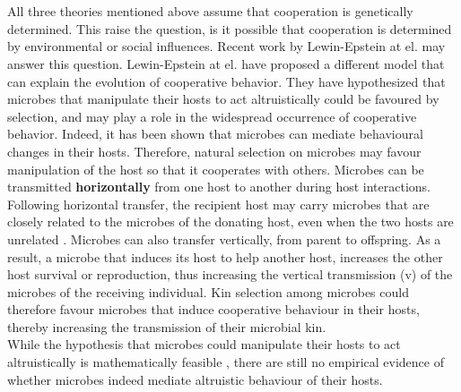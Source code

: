 \documentclass{article}
\begin{document}
\\\\All three theories mentioned above assume that cooperation is genetically determined. This raise the question, is it possible that cooperation is determined by environmental or social influences. Recent work by Lewin-Epstein at el.\cite{lewin2017microbes} may answer this question. 
Lewin-Epstein at el. \cite{lewin2017microbes} have proposed a different model that can explain the evolution of  cooperative behavior. They have hypothesized that microbes that manipulate their hosts to act altruistically could be favoured by selection, and may play a role in the widespread occurrence of cooperative behavior. Indeed, it has been shown that microbes can mediate behavioural changes in their hosts\cite{poulin2010parasite}\cite{dobson1988population}. Therefore, natural selection on microbes may favour manipulation of the host so that it cooperates with others. Microbes can be transmitted \textbf{horizontally} from one host to another during host interactions. Following horizontal transfer, the recipient host may carry microbes that are closely related to the microbes of the donating host, even when the two hosts are unrelated \cite{lewin2017microbes}. Microbes can also transfer vertically, from parent to
offspring. As a result, a microbe that induces its host to help another host, increases the other host survival or reproduction, thus increasing the vertical transmission (v) of the microbes of the receiving individual. Kin selection among microbes could therefore favour microbes that induce cooperative behaviour in their hosts, thereby increasing the transmission of their microbial kin.
\\While the hypothesis that microbes could manipulate their hosts to act altruistically is mathematically feasible \cite{lewin2017microbes}, there are still no empirical evidence of whether microbes indeed mediate altruistic behaviour of their hosts.
\end{document}
